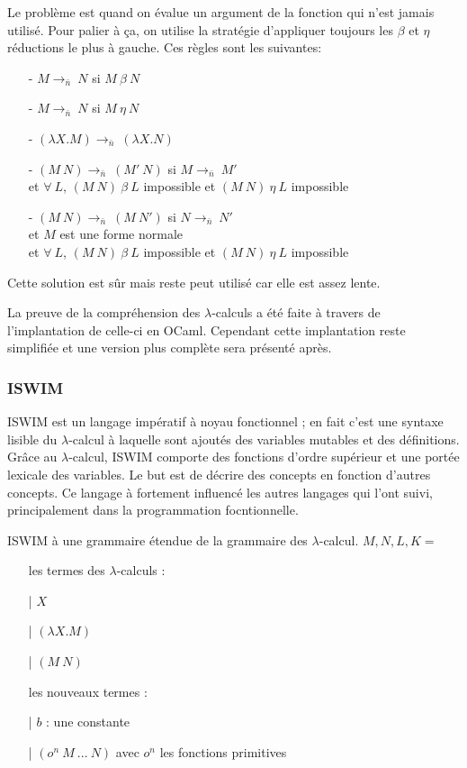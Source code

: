 \documentclass[10pt,a4paper]{article}
\begin{document}
				Le problème est quand on évalue un argument de la fonction qui n'est jamais utilisé. Pour palier à ça, on utilise la stratégie d'appliquer toujours les $\beta$ et $\eta$ réductions le plus à gauche. Ces règles sont les suivantes:
				\begin{itemize}
					\item[-] $M \longrightarrow_{\bar{n}}~N$ si $M~\beta~N$
					\item[-] $M \longrightarrow_{\bar{n}}~N$ si $M~\eta~N$
					\item[-] $(\lambda X.M) \longrightarrow_{\bar{n}}~(\lambda X.N)$
					\item[-] $(M~N) \longrightarrow_{\bar{n}}~(M'~N)$ si $M \longrightarrow_{\bar{n}}~M'$
					\\ et $\forall~L$, $(M~N)~\beta~L$ impossible et $(M~N)~\eta~L$ impossible
					\item[-] $(M~N) \longrightarrow_{\bar{n}}~(M~N')$ si $N \longrightarrow_{\bar{n}}~N'$
					\\ et $M$ est une forme normale
					\\ et  $\forall~L$, $(M~N)~\beta~L$ impossible et $(M~N)~\eta~L$ impossible
				\end{itemize}
				\smallbreak
				Cette solution est sûr mais reste peut utilisé car elle est assez lente. 
				\medbreak
			
				La preuve de la compréhension des $\lambda$-calculs a été faite à travers de l'implantation de celle-ci en OCaml. Cependant cette implantation reste simplifiée et une version plus complète sera présenté après. 
			
			\subsubsection{ISWIM}	
			
				ISWIM est un langage impératif à noyau fonctionnel ; en fait c'est une syntaxe lisible du $\lambda$-calcul à laquelle sont ajoutés des variables mutables et des définitions. Grâce au $\lambda$-calcul, ISWIM comporte des fonctions d'ordre supérieur et une portée lexicale des variables. Le but est de décrire des concepts en fonction d'autres concepts. Ce langage à fortement influencé les autres langages qui l'ont suivi, principalement dans la programmation focntionnelle.
				\medbreak
			 
				ISWIM à une grammaire étendue de la grammaire des $\lambda$-calcul.
				\smallbreak
				$M,N,L,K =$
				\begin{itemize}
					\item[ ] les termes des $\lambda$-calculs :
					\item[|] $X$ 
					\item[|] $(\lambda X.M)$
					\item[|] $(M~N)$
					\item[ ] les nouveaux termes :
					\item[|] $b$ : une constante
					\item[|] $(o^{n}~M~...~N)$ avec $o^{n}$ les fonctions primitives
				\end{itemize}
				\medbreak
				
\end{document}
